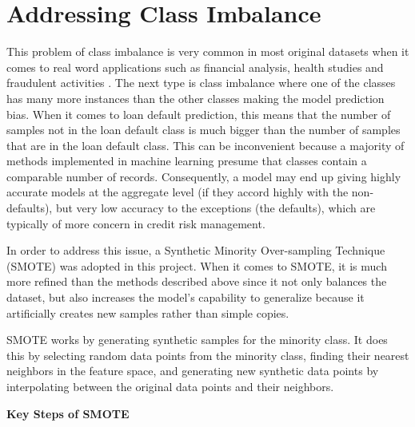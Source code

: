 \documentclass[12pt, a4paper,oneside]{book}
\numberwithin{equation}{section}
\begin{document}
\section{Addressing Class Imbalance}

This problem of class imbalance is very common in most original datasets when it comes to real word applications such as financial analysis, health studies and fraudulent activities \cite{he2008adasyn}. The next type is class imbalance where one of the classes has many more instances than the other classes making the model prediction bias. When it comes to loan default prediction, this means that the number of samples not in the loan default class is much bigger than the number of samples that are in the loan default class. This can be inconvenient because a majority of methods implemented in machine learning presume that classes contain a comparable number of records. Consequently, a model may end up giving highly accurate models at the aggregate level (if they accord highly with the non-defaults), but very low accuracy to the exceptions (the defaults), which are typically of more concern in credit risk management. 

In order to address this issue, a Synthetic Minority Over-sampling Technique (SMOTE) was adopted in this project. When it comes to SMOTE, it is much more refined than the methods described above since it not only balances the dataset, but also increases the model’s capability to generalize because it artificially creates new samples rather than simple copies. 

SMOTE works by generating synthetic samples for the minority class. It does this by selecting random data points from the minority class, finding their nearest neighbors in the feature space, and generating new synthetic data points by interpolating between the original data points and their neighbors.

\textbf{Key Steps of SMOTE}
\end{document}
